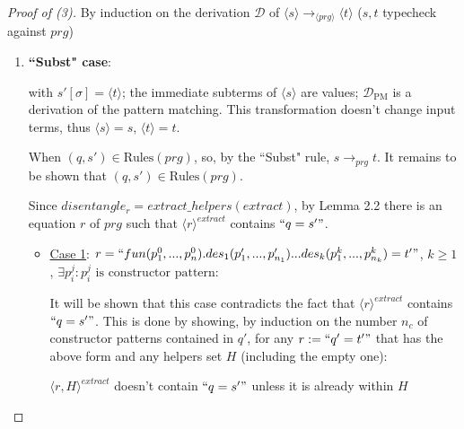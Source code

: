 \documentclass[11pt]{article} %
\begin{document}
\begin{proof}[Proof of (3)] By induction on the derivation $\mathcal{D}$ of $\langle s \rangle \longrightarrow_{\langle prg \rangle} \langle t \rangle$ ($s,t$ typecheck against $prg$)

\begin{enumerate}
\item \textbf{``Subst" case}:

\begin{prooftree}
\end{prooftree}

with $s'[\sigma] = \langle t \rangle$; the immediate subterms of $\langle s \rangle$ are values; $\mathcal{D}_{\textrm{PM}}$ is a derivation of the pattern matching. This transformation doesn't change input terms, thus $\langle s \rangle = s$, $\langle t \rangle = t$.

When $(q, s') \in \textrm{Rules}(prg)$, so, by the ``Subst" rule, $s \longrightarrow_{prg} t$. It remains to be shown that $(q, s') \in \textrm{Rules}(prg)$.

Since $disentangle_r = extract\_helpers(extract)$, by Lemma 2.2 there is an equation $r$ of $prg$ such that $\langle r \rangle^{extract}$ contains $`` q = s' "$.

\begin{itemize}

\item \underline{Case 1}: $r = `` fun(p^0_1, ..., p^0_n).des_1(p'_1, ..., p'_{n_1})...des_k(p^k_1, ..., p^k_{n_k}) = t' " $, $k \geq 1$, $\exists p^j_i: p^j_i \textrm{ is constructor pattern}$:

It will be shown that this case contradicts the fact that $\langle r \rangle^{extract}$ contains $`` q = s' "$. This is done by showing, by induction on the number $n_c$ of constructor patterns contained in $q'$, for any $r := `` q' = t' "$ that has the above form and any helpers set $H$ (including the empty one):

$\langle r , H \rangle^{extract}$ doesn't contain $`` q = s' "$ unless it is already within $H$

\begin{enumerate}


\end{enumerate}
\end{itemize}
\end{enumerate}
\end{proof}
\end{document}
